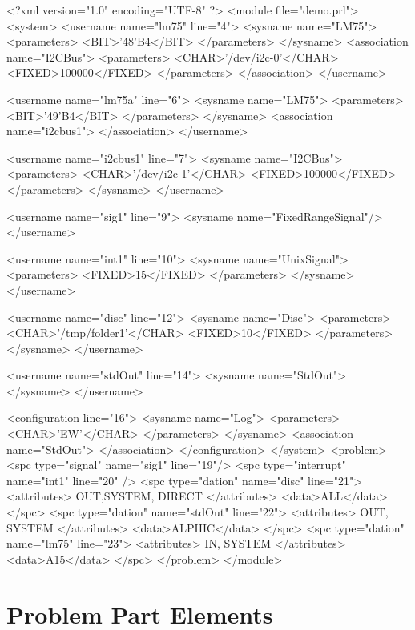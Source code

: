 \begin{XMLCode}
<?xml version="1.0" encoding="UTF-8" ?>
<module file="demo.prl">
<system>
   <username name="lm75" line="4">
      <sysname name="LM75">
      <parameters>
         <BIT>'48'B4</BIT>
      </parameters>
   </sysname>
   <association name="I2CBus">
      <parameters>
         <CHAR>'/dev/i2c-0'</CHAR>
         <FIXED>100000</FIXED>
      </parameters>
   </association>
</username>

<username name="lm75a" line="6">
   <sysname name="LM75">
      <parameters>
         <BIT>'49'B4</BIT>
      </parameters>
   </sysname>
   <association name="i2cbus1">
   </association>
</username>

<username name="i2cbus1" line="7">
   <sysname name="I2CBus">
      <parameters>
         <CHAR>'/dev/i2c-1'</CHAR>
         <FIXED>100000</FIXED>
      </parameters>
   </sysname>
</username>

<username name="sig1" line="9">
   <sysname name="FixedRangeSignal"/>
</username>

<username name="int1" line="10">
   <sysname name="UnixSignal">
      <parameters>
         <FIXED>15</FIXED>
      </parameters>
   </sysname>
</username>

<username name="disc" line="12">
   <sysname name="Disc">
      <parameters>
         <CHAR>'/tmp/folder1'</CHAR>
         <FIXED>10</FIXED>
      </parameters>
   </sysname>
</username>

<username name="stdOut" line="14">
   <sysname name="StdOut">
   </sysname>
</username> 

<configuration line="16">
   <sysname name="Log">
      <parameters>
         <CHAR>'EW'</CHAR>
      </parameters>
   </sysname>
   <association name="StdOut">
   </association>
</configuration>
</system>
<problem>
<spc type="signal" name="sig1" line="19"/>
<spc type="interrupt" name="int1" line="20" />
<spc type="dation" name="disc" line="21">
   <attributes> OUT,SYSTEM, DIRECT </attributes>
   <data>ALL</data>
</spc>
<spc type="dation" name="stdOut" line="22">
      <attributes> OUT, SYSTEM </attributes>
      <data>ALPHIC</data>
</spc>
<spc type="dation" name="lm75" line="23">
      <attributes> IN, SYSTEM </attributes>
      <data>A15</data>
</spc>
</problem>
</module>
\end{XMLCode}
\section{Problem Part Elements}
